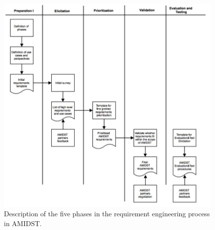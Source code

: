 \begin{figure}[htbp]
\centering
\includegraphics [keepaspectratio,width = 14cm] {REprocess1}
\caption{Description of the five phases in the requirement engineering process in AMIDST.}
\label{REprocess1}
\end{figure}







